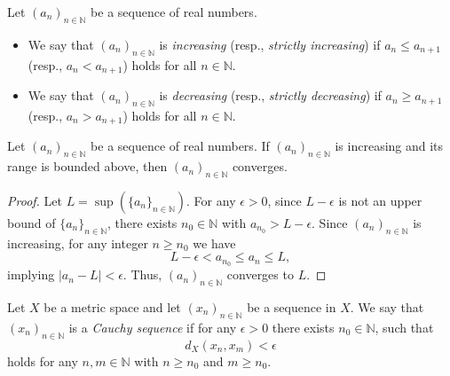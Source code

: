 \begin{definition}
  Let $(a_n)_{n \in \mathbb{N}}$ be a sequence of real numbers.
  \begin{itemize}
    \item We say that $(a_n)_{n \in \mathbb{N}}$ is \emph{increasing}
    (resp., \emph{strictly increasing}) if $a_n \leq a_{n+1}$
    (resp., $a_n < a_{n+1}$) holds for all $n \in \mathbb{N}$.
    \item We say that $(a_n)_{n \in \mathbb{N}}$ is \emph{decreasing}
    (resp., \emph{strictly decreasing}) if $a_n \geq a_{n+1}$
    (resp., $a_n > a_{n+1}$) holds for all $n \in \mathbb{N}$.
  \end{itemize}
\end{definition}

\begin{theorem}
  Let $(a_n)_{n \in \mathbb{N}}$ be a sequence of real numbers.
  If $(a_n)_{n \in \mathbb{N}}$ is increasing and its range is bounded above,
  then $(a_n)_{n \in \mathbb{N}}$ converges.
\end{theorem}
\begin{proof}
  Let $L = \sup(\{a_n\}_{n \in \mathbb{N}})$.
  For any $\epsilon > 0$, since $L - \epsilon$ is not an upper bound of
  $\{a_n\}_{n \in \mathbb{N}}$, there exists $n_0 \in \mathbb{N}$ with
  $a_{n_0} > L - \epsilon$.
  Since $(a_n)_{n \in \mathbb{N}}$ is increasing, for any integer $n \geq n_0$
  we have
  \begin{equation*}
    L - \epsilon < a_{n_0} \leq a_n \leq L,
  \end{equation*}
  implying $|a_n - L| < \epsilon$.
  Thus, $(a_n)_{n \in \mathbb{N}}$ converges to $L$.
\end{proof}

\begin{definition}
  Let $X$ be a metric space and let $(x_n)_{n \in \mathbb{N}}$ be a sequence in
  $X$.
  We say that $(x_n)_{n \in \mathbb{N}}$ is a \emph{Cauchy sequence} if for any
  $\epsilon > 0$ there exists $n_0 \in \mathbb{N}$, such that
  \begin{equation*}
    d_X(x_n, x_m) < \epsilon
  \end{equation*}
  holds for any $n, m \in \mathbb{N}$ with $n \geq n_0$ and $m \geq n_0$.
\end{definition}